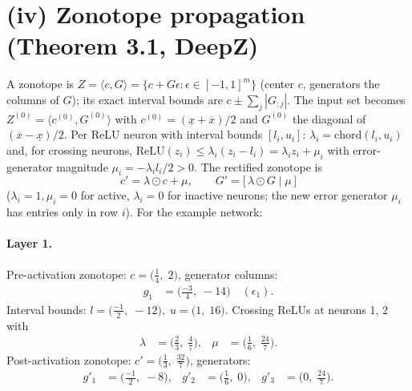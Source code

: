\documentclass[11pt]{article}
\begin{document}
\section{(iv) Zonotope propagation (Theorem 3.1, DeepZ)}
A zonotope is $Z = \langle c, G \rangle = \{c + G\epsilon : \epsilon \in [-1,1]^m\}$
(center $c$, generators the columns of $G$); its exact interval bounds are
$c \pm \sum_j |G_{:j}|$. The input set becomes $Z^{(0)} = \langle c^{(0)}, G^{(0)} \rangle$ with
$c^{(0)} = (\underline{x} + \overline{x})/2$ and $G^{(0)}$ the diagonal of $(\overline{x} - \underline{x})/2$.
Per ReLU neuron with interval bounds $[l_i, u_i]$:
$\lambda_i = \mathrm{chord}(l_i, u_i)$ and, for crossing neurons,
$\mathrm{ReLU}(z_i) \le \lambda_i (z_i - l_i) = \lambda_i z_i + \mu_i$ with error-generator magnitude
$\mu_i = -\lambda_i l_i / 2 > 0$. The rectified zonotope is
\begin{equation*}
c' = \lambda \odot c + \mu, \qquad G' = \bigl[\, \lambda \odot G \;\big|\; \mu\, \bigr]
\end{equation*}
($\lambda_i = 1, \mu_i = 0$ for active, $\lambda_i = 0$ for inactive neurons;
the new error generator $\mu_i$ has entries only in row $i$).
For the example network:
\paragraph{Layer 1.}
Pre-activation zonotope: $c = \bigl(\frac{1}{4},\; 2\bigr)$, generator columns:
\begin{align*}
g_{1} &= \bigl(\frac{-3}{4},\; -14\bigr) \quad (\epsilon_{1}).
\end{align*}
Interval bounds: $l = \bigl(\frac{-1}{2},\; -12\bigr), \; u = \bigl(1,\; 16\bigr)$. 
Crossing ReLUs at neurons 1, 2 with
\begin{align*}
\lambda &= \bigl(\frac{2}{3},\; \frac{4}{7}\bigr), & \mu &= \bigl(\frac{1}{6},\; \frac{24}{7}\bigr).
\end{align*}
Post-activation zonotope: $c' = \bigl(\frac{1}{3},\; \frac{32}{7}\bigr)$, generators:
\begin{align*}
g'_{1} &= \bigl(\frac{-1}{2},\; -8\bigr), &
g'_{2} &= \bigl(\frac{1}{6},\; 0\bigr), &
g'_{3} &= \bigl(0,\; \frac{24}{7}\bigr).
\end{align*}
\end{document}
